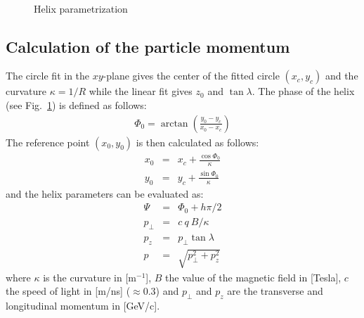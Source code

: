 \documentclass[twoside]{article}
\begin{document}
\begin{figure}[thb]
\mbox{
  \quad
  }
  \caption{Helix parametrization}
  \label{fig:helix}
\end{figure}

\subsection{Calculation of the particle momentum}

The circle fit in the $xy$-plane gives the center of the fitted circle $(x_c, y_c)$
and the curvature $\kappa = 1/R$ while the linear fit gives $z_0$ and $\tan \lambda$.
The phase of the helix (see Fig.~\ref{fig:helix}) is defined as follows:
\begin{eqnarray}
  \Phi_0 = \arctan \left( \frac{y_0 - y_c}{x_0 - x_c} \right)
\end{eqnarray}
The reference point $(x_0, y_0)$ is then calculated as follows:
\begin{eqnarray}
  x_0 & = & x_c + \frac{\cos \Phi_0}{\kappa} \\
  y_0 & = & y_c + \frac{\sin \Phi_0}{\kappa}
\end{eqnarray}
and the helix parameters can be evaluated as:
\begin{eqnarray}
  \Psi & = & \Phi_0 + h \pi / 2 \\
  p_\perp & = & c\ q\ B / \kappa \\
  p_z & = & p_\perp \tan \lambda \\
  p & = & \sqrt{p^2_\perp + p^2_z}
\end{eqnarray}
where $\kappa$ is the curvature in [m$^{-1}$], $B$ the value of the
magnetic field in [Tesla], $c$ the speed of light in [m/ns] ($\approx
0.3$) and $p_\perp$ and $p_z$ are the transverse and longitudinal
momentum in [GeV/c].
\end{document}
